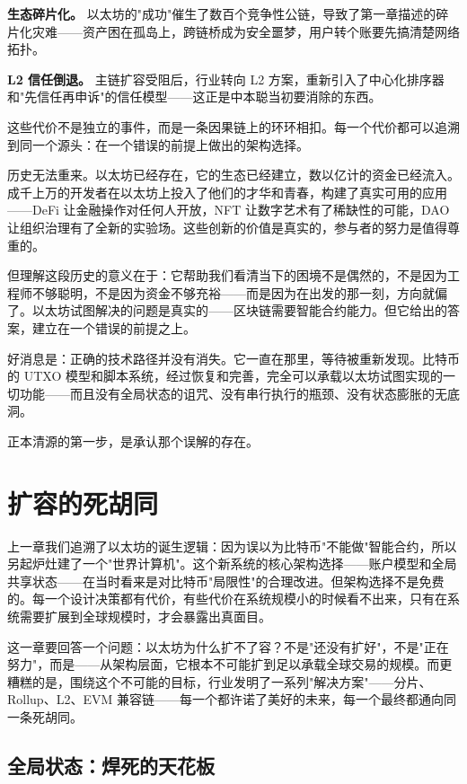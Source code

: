 \documentclass[a4paper,12pt,openany]{ctexbook}
\begin{document}
\textbf{生态碎片化。} 以太坊的"成功"催生了数百个竞争性公链，导致了第一章描述的碎片化灾难——资产困在孤岛上，跨链桥成为安全噩梦，用户转个账要先搞清楚网络拓扑。

\textbf{L2 信任倒退。} 主链扩容受阻后，行业转向 L2 方案，重新引入了中心化排序器和"先信任再申诉"的信任模型——这正是中本聪当初要消除的东西。

这些代价不是独立的事件，而是一条因果链上的环环相扣。每一个代价都可以追溯到同一个源头：在一个错误的前提上做出的架构选择。

历史无法重来。以太坊已经存在，它的生态已经建立，数以亿计的资金已经流入。成千上万的开发者在以太坊上投入了他们的才华和青春，构建了真实可用的应用——DeFi 让金融操作对任何人开放，NFT 让数字艺术有了稀缺性的可能，DAO 让组织治理有了全新的实验场。这些创新的价值是真实的，参与者的努力是值得尊重的。

但理解这段历史的意义在于：它帮助我们看清当下的困境不是偶然的，不是因为工程师不够聪明，不是因为资金不够充裕——而是因为在出发的那一刻，方向就偏了。以太坊试图解决的问题是真实的——区块链需要智能合约能力。但它给出的答案，建立在一个错误的前提之上。

好消息是：正确的技术路径并没有消失。它一直在那里，等待被重新发现。比特币的 UTXO 模型和脚本系统，经过恢复和完善，完全可以承载以太坊试图实现的一切功能——而且没有全局状态的诅咒、没有串行执行的瓶颈、没有状态膨胀的无底洞。

正本清源的第一步，是承认那个误解的存在。



\chapter{扩容的死胡同}


上一章我们追溯了以太坊的诞生逻辑：因为误以为比特币"不能做"智能合约，所以另起炉灶建了一个"世界计算机"。这个新系统的核心架构选择——账户模型和全局共享状态——在当时看来是对比特币"局限性"的合理改进。但架构选择不是免费的。每一个设计决策都有代价，有些代价在系统规模小的时候看不出来，只有在系统需要扩展到全球规模时，才会暴露出真面目。

这一章要回答一个问题：以太坊为什么扩不了容？不是"还没有扩好"，不是"正在努力"，而是——从架构层面，它根本不可能扩到足以承载全球交易的规模。而更糟糕的是，围绕这个不可能的目标，行业发明了一系列"解决方案"——分片、Rollup、L2、EVM 兼容链——每一个都许诺了美好的未来，每一个最终都通向同一条死胡同。


\section*{全局状态：焊死的天花板}
\end{document}
